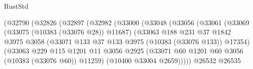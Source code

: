 \begin{lexlean}{RustStd}
\begin{coremodule}
                                      (@32790
                                        (@32826
                                          (@32897
                                            (@32982
                                              (@33000
                                                (@33048
                                                  (@33056
                                                    (@33061
                                                      (@33069
                                                        (@33075 (@10383 (@33076 @28)) @11687)
                                                        (@33063
                                                          @188
                                                          @231
                                                          @37
                                                          @1842
                                                          @3975
                                                          @3058
                                                          (@33071
                                                            @133
                                                            @37
                                                            @133
                                                            @3975
                                                            (@10383 (@33076 @133))
                                                            @17354)
                                                          (@33063
                                                            @229
                                                            @115
                                                            @1201
                                                            @11
                                                            @3056
                                                            @2925
                                                            (@33071
                                                              @60
                                                              @1201
                                                              @60
                                                              @3056
                                                              (@10383 (@33076 @60))
                                                              @11259)
                                                            (@10400 @33004 @2659)))))
                                                    @26532
                                                    @26535

\end{coremodule}
\end{lexlean}
